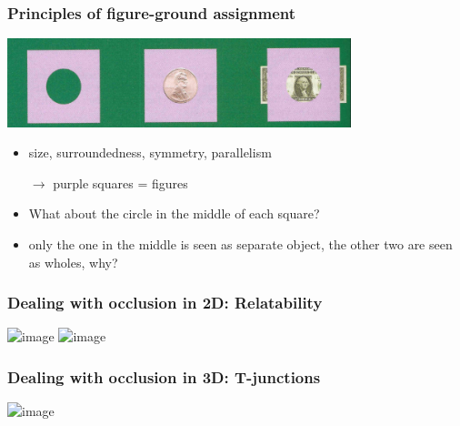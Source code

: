 \documentclass[]{beamer}
\begin{document}
\begin{frame}
 \frametitle{Principles of figure-ground assignment}
\begin{center}
\includegraphics[width=100mm]{figs/l5/figures_holes.png}
\begin{itemize}
 \item size, surroundedness, symmetry, parallelism 
 \item[$\rightarrow$] purple squares = figures
 \item[]
 \item What about the circle in the middle of each square?
 \item<2-> only the one in the middle is seen as separate object, the other two are seen as wholes, why?
\end{itemize}
\end{center}
\end{frame}

\begin{frame}
 \frametitle{Dealing with occlusion in 2D: Relatability}
\begin{overlayarea}{110mm}{90mm}
\begin{center}
\includegraphics<1-2>[width=50mm]{figs/l5/relatability.png}
\includegraphics<3>[width=70mm]{../../../figures/amodal_michotte.png}
\end{center}
\end{overlayarea}
\end{frame}


\begin{frame}
 \frametitle{Dealing with occlusion in 3D: T-junctions}
\begin{overlayarea}{110mm}{50mm}
\begin{center}
\includegraphics<1>[width=70mm]{figs/l5/T_junctions.png}
\end{center}
\end{overlayarea}
\end{frame}
\end{document}
